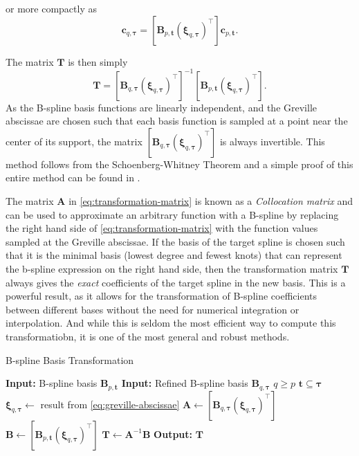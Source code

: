 or more compactly as
\begin{equation}
    [\mathbf B_{q,\boldsymbol \tau}(\boldsymbol \xi_{q,\boldsymbol \tau})^\top] \mathbf c_{q, \boldsymbol \tau} = [\mathbf B_{p,\mathbf t}(\boldsymbol \xi_{q,\boldsymbol \tau})^\top] \mathbf c_{p, \mathbf t}.
\end{equation}

The matrix $\mathbf T$ is then simply
\begin{equation}\label{eq:transformation-matrix-solution}
    \mathbf T = [\mathbf B_{q,\boldsymbol \tau}(\boldsymbol \xi_{q,\boldsymbol \tau})^\top]^{-1} [\mathbf B_{p,\mathbf t}(\boldsymbol \xi_{q,\boldsymbol \tau})^{\top}].
\end{equation}
As the B-spline basis functions are linearly independent, and the Greville abscissae are chosen such that each basis function is sampled at a point near the center of its support, the matrix $[\mathbf B_{q,\boldsymbol \tau}(\boldsymbol \xi_{q,\boldsymbol \tau})^\top]$ is always invertible. This method follows from the Schoenberg-Whitney Theorem \citep{schoenberg1988polya} and a simple proof of this entire method can be found in \cite{schoenberg2022proof}. 

The matrix $\mathbf A$ in \cref{eq:transformation-matrix} is known as a \emph{Collocation matrix} and can be used to approximate an arbitrary function with a B-spline by replacing the right hand side of \cref{eq:transformation-matrix} with the function values sampled at the Greville abscissae. 
If the basis of the target spline is chosen such that it is the minimal basis (lowest degree and fewest knots) that can represent the b-spline expression on the right hand side, then the transformation matrix $\mathbf T$ always gives the \textit{exact} coefficients of the target spline in the new basis. This is a powerful result, as it allows for the transformation of B-spline coefficients between different bases without the need for numerical integration or interpolation.
And while this is seldom the most efficient way to compute this transformatiobn, it is one of the most general and robust methods.

\begin{algorithm}
    \caption{B-spline Basis Transformation}\label{alg:basis-transformation}
    \begin{algorithmic}[1]
        \State \textbf{Input:} B-spline basis $\mathbf{B}_{p,\mathbf{t}}$
        \State \textbf{Input:} Refined B-spline basis $\mathbf B_{q,\boldsymbol \tau}$
        \Ensure $q \geq p$
        \Ensure $\mathbf t \subseteq \boldsymbol \tau$
        \State $\boldsymbol \xi_{q, \boldsymbol \tau} \gets$ result from \cref{eq:greville-abscissae}
        \State $\mathbf A \gets [\mathbf B_{q,\boldsymbol \tau}(\boldsymbol \xi_{q,\boldsymbol \tau})^\top]$
        \State $\mathbf B \gets [\mathbf B_{p,\mathbf t}(\boldsymbol \xi_{q,\boldsymbol \tau})^\top]$
        \State $\mathbf T \gets \mathbf A^{-1} \mathbf B$
        \State \textbf{Output:} $\mathbf T$
    \end{algorithmic}
\end{algorithm}

